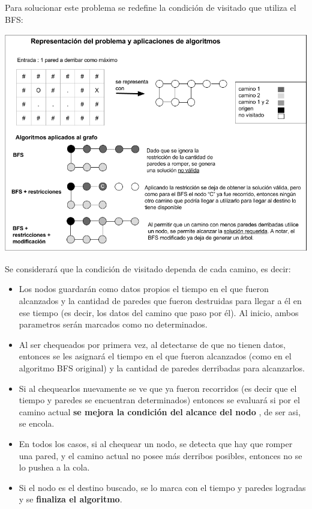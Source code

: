 Para solucionar este problema se redefine la condición de visitado que utiliza el BFS:

  \vspace*{0.3cm} \vspace*{0.3cm}
  \begin{center}
 \includegraphics[scale=0.6]{./EJ1/ej1-explicacion.png}
  \end{center}
  \vspace*{0.3cm}

Se considerará que la condición de visitado dependa de cada camino, es decir:

\begin{itemize}
	\item Los nodos guardarán como datos propios el tiempo en el que fueron alcanzados y la cantidad de paredes que fueron destruidas para llegar a él en ese tiempo (es decir, los datos del camino que paso por él). Al inicio, ambos parametros serán marcados como no determinados.
	\item Al ser chequeados por primera vez, al detectarse de que no tienen datos, entonces se les asignará el tiempo en el que fueron alcanzados (como en el algoritmo BFS original) y la cantidad de paredes derribadas para alcanzarlos.
	\item Si al chequearlos nuevamente se ve que ya fueron recorridos (es decir que el tiempo y paredes se encuentran determinados) entonces se evaluará si por el camino actual {\bf se mejora la condición del alcance del nodo} , de ser asi, se encola.
	\item En todos los casos, si al chequear un nodo, se detecta que hay que romper una pared, y el camino actual no posee más derribos posibles, entonces no se lo pushea a la cola.
	\item Si el nodo es el destino buscado, se lo marca con el tiempo y paredes logradas y se {\bf finaliza el algoritmo}.
	
\end{itemize}


